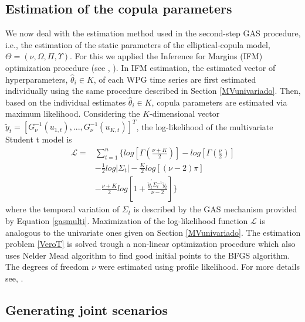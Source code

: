 \documentclass[a4paper]{IEEEtran}
\begin{document}
\subsection{Estimation of the copula parameters}\label{copula_par}
We now deal with the estimation method used in the second-step GAS procedure, i.e., the estimation of the static parameters of the elliptical-copula model, $\Theta=(\nu,\Omega,\Pi,\Upsilon)$. For this we applied the Inference for Margins (IFM) optimization procedure (see \cite{xu1996statistical}, \cite{joe1997multivariate}). In IFM estimation, the estimated vector of hyperparameters, $\hat{\theta}_i \in K$, of each WPG time series are first estimated individually using the same procedure described in Section \ref{MVunivariado}. Then, based on the individual estimates $\hat{\theta}_i \in K$, copula parameters are estimated via maximum likelihood. Considering the $K$-dimensional vector $\tilde{y}_{t}=[G_{\nu}^{-1}(u_{1,t}), ..., G_{\nu}^{-1}(u_{K,t})]^T$, the log-likelihood of the multivariate Student t model is
\begin{equation}
\begin{split}
\mathcal{L}=&\sum_{t=1}^{n}\Bigg\{ log \left[\Gamma \left(\frac{\nu+K}{2} \right) \right] -log \left[\Gamma \left(\frac{\nu}{2} \right) \right]\\
&-\frac{1}{2} log |\Sigma_{t}| - \frac{K}{2}log[(\nu-2)\pi] \\&- \frac{\nu+K}{2} log\left[ 1+\frac{\tilde{y}_{t}^{'}\Sigma^{-1}_{t}\tilde{y}_{t}}{\nu-2}\right] \Bigg\}
\label{VeroT}
\end{split}
\end{equation}
\noindent
where the temporal variation of $\Sigma_{t}$ is described by the GAS mechanism provided by Equation \eqref{gasmulti}. Maximization of the log-likelihood function $\mathcal{L}$ is analogous to the univariate ones given on Section \ref{MVunivariado}. The estimation problem \eqref{VeroT} is solved trough a non-linear optimization procedure which also uses Nelder Mead algorithm to find good initial points to the BFGS algorithm. The degrees of freedom $\nu$ were estimated using profile likelihood. For more details see, \cite{murphy2000profile}. %

\subsection{Generating joint scenarios}\label{dep_scenarios}
\end{document}
